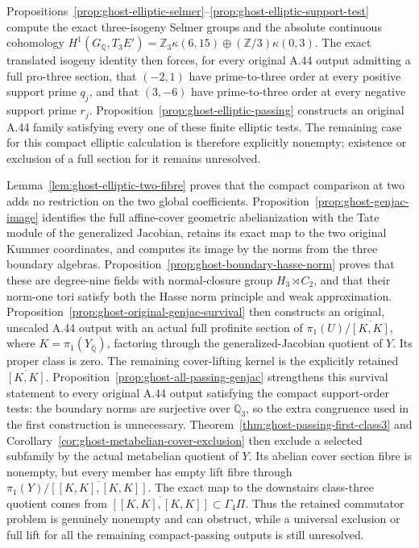 Propositions~\ref{prop:ghost-elliptic-selmer}--\ref{prop:ghost-elliptic-support-test}
compute the exact three-isogeny Selmer groups and the
absolute continuous cohomology
\(H^1(G_{\mathbb Q},T_3E')=\mathbb Z_3\kappa(6,15)
\oplus(\mathbb Z/3)\kappa(0,3)\).
The exact translated isogeny identity then forces, for
every original A.44 output admitting a full pro-three
section, that \((-2,1)\) have prime-to-three order
at every positive support prime \(q_j\), and that
\((3,-6)\) have prime-to-three order at every negative
support prime \(r_j\). Proposition~\ref{prop:ghost-elliptic-passing}
constructs an original A.44 family satisfying every
one of these finite elliptic tests. The remaining case
for this compact elliptic calculation is therefore
explicitly nonempty; existence or exclusion of a full
section for it remains unresolved.

Lemma~\ref{lem:ghost-elliptic-two-fibre} proves that the
compact comparison at two adds no restriction on the two
global coefficients. Proposition~\ref{prop:ghost-genjac-image}
identifies the full affine-cover geometric abelianization
with the Tate module of the generalized Jacobian, retains
its exact map to the two original Kummer coordinates, and
computes its image by the norms from the three boundary
algebras. Proposition~\ref{prop:ghost-boundary-hasse-norm}
proves that these are degree-nine fields with normal-closure
group \(H_3\rtimes C_2\), and that their norm-one tori satisfy
both the Hasse norm principle and weak approximation.
Proposition~\ref{prop:ghost-original-genjac-survival} then
constructs an original, unscaled A.44 output with an actual
full profinite section of
\(\pi_1(U)/\overline{[K,K]}\), where
\(K=\pi_1(Y_{\overline{\mathbb Q}})\), factoring through the
generalized-Jacobian quotient of \(Y\). Its proper class is
zero. The remaining cover-lifting kernel is the explicitly
retained \(\overline{[K,K]}\).
Proposition~\ref{prop:ghost-all-passing-genjac} strengthens
this survival statement to every original A.44 output
satisfying the compact support-order tests: the boundary
norms are surjective over \(\mathbb Q_3\), so the extra
congruence used in the first construction is unnecessary.
Theorem~\ref{thm:ghost-passing-first-class3} and
Corollary~\ref{cor:ghost-metabelian-cover-exclusion}
then exclude a selected subfamily by the actual
metabelian quotient of \(Y\). Its abelian cover
section fibre is nonempty, but every member has empty
lift fibre through
\(\pi_1(Y)/\overline{[[K,K],[K,K]]}\).
The exact map to the downstairs class-three quotient
comes from
\(\overline{[[K,K],[K,K]]}\subset\Gamma_4\Pi\).
Thus the retained commutator problem is genuinely
nonempty and can obstruct, while a universal exclusion
or full lift for all the remaining compact-passing
outputs is still unresolved.

